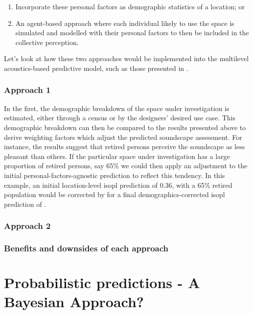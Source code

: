 \begin{enumerate}
  \item Incorporate these personal factors as demographic statistics of a location; or
  \item An agent-based approach where each individual likely to use the space is simulated and modelled with their personal factors to then be included in the collective perception.
\end{enumerate}

Let's look at how these two approaches would be implemented into the multilevel acoustics-based predictive model, such as those presented in .

\subsubsection{Approach 1}
In the first, the demographic breakdown of the space under investigation is estimated, either through a census or by the designers' desired use case. This demographic breakdown can then be compared to the results presented above \citep{Erfanian2021Psychological} to derive weighting factors which adjust the predicted soundscape assessment. For instance, the results suggest that retired persons perceive the soundscape as  less pleasant than others. If the particular space under investigation has a large proportion of retired persons, say 65\% we could then apply an adjustment to the initial personal-factors-agnostic prediction to reflect this tendency. In this example, an initial location-level \gls{isopl} prediction of 0.36, with a 65\% retired population would be corrected by  for a final demographics-corrected \gls{isopl} prediction of .

\subsubsection{Approach 2}

\subsubsection{Benefits and downsides of each approach}

\section{Probabilistic predictions - A Bayesian Approach?}

